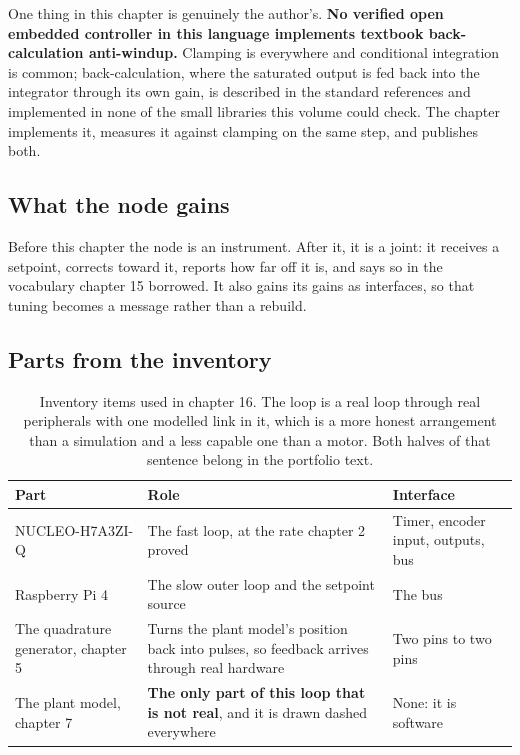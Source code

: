 One thing in this chapter is genuinely the author's. \textbf{No verified open
embedded controller in this language implements textbook back-calculation
anti-windup.} Clamping is everywhere and conditional integration is common;
back-calculation, where the saturated output is fed back into the integrator
through its own gain, is described in the standard references and implemented in
none of the small libraries this volume could check. The chapter implements it,
measures it against clamping on the same step, and publishes both.

\subsection*{What the node gains}

Before this chapter the node is an instrument. After it, it is a joint: it
receives a setpoint, corrects toward it, reports how far off it is, and says so
in the vocabulary chapter 15 borrowed. It also gains its gains as interfaces, so
that tuning becomes a message rather than a rebuild.

\subsection*{Parts from the inventory}

\begin{table}[H]\centering\small
\begin{tabular}{p{40mm}p{66mm}p{40mm}}
\toprule
Part & Role & Interface \\
\midrule
NUCLEO-H7A3ZI-Q & The fast loop, at the rate chapter 2 proved & Timer, encoder input, outputs, bus \\
Raspberry Pi 4 & The slow outer loop and the setpoint source & The bus \\
The quadrature generator, chapter 5 & Turns the plant model's position back into
pulses, so feedback arrives through real hardware & Two pins to two pins \\
The plant model, chapter 7 & \textbf{The only part of this loop that is not
real}, and it is drawn dashed everywhere & None: it is software \\
\bottomrule
\end{tabular}
\caption{Inventory items used in chapter 16. The loop is a real loop through real peripherals with one modelled link in it, which is a more honest arrangement than a simulation and a less capable one than a motor. Both halves of that sentence belong in the portfolio text.}
\end{table}

